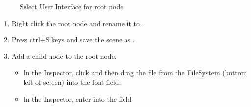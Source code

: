 \documentclass[letterpaper,10pt,english]{sphinxmanual}
\begin{document}
\begin{figure}[htbp]
\centering
\capstart

\noindent{}
\caption{Select User Interface for root node}\label{\detokenize{tutorial:id3}}\end{figure}
\begin{enumerate}
%
\setcounter{enumi}{2}
\item {} 
\sphinxAtStartPar
Right click the root node  and rename it to .

\item {} 
\sphinxAtStartPar
Press ctrl+S keys and save the scene as .

\item {} 
\sphinxAtStartPar
Add a  child node to the root node.
\begin{itemize}
\item {} 
\sphinxAtStartPar
In the Inspector, click  and then drag the
 file from the FileSystem (bottom left of screen)
into the \sphinxstylestrong{{[}empty{]}} font field.

\item {} 
\sphinxAtStartPar
In the Inspector, enter into the  field

\end{itemize}

\end{enumerate}
\end{document}
